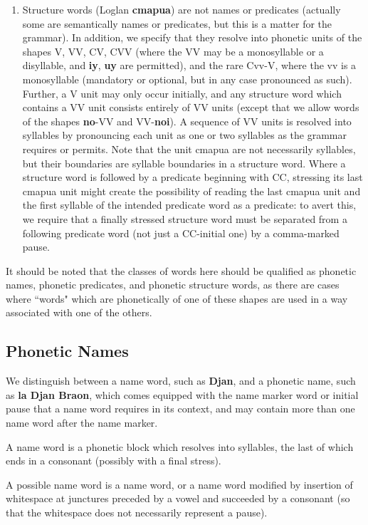 \documentclass[12pt]{book}
\begin{document}
\begin{enumerate}
\item Structure words (Loglan {\bf cmapua}) are not names or predicates (actually some are semantically names or predicates, but this is a matter for the grammar).  In addition, we specify that they resolve into phonetic units of the shapes V, VV, CV, CVV (where the VV may be a monosyllable or a disyllable, and {\bf iy}, {\bf uy} are permitted), and the rare Cvv-V, where the vv is a monosyllable (mandatory or optional, but in any case pronounced as such).
Further, a V unit may only occur initially, and any structure word which contains a VV unit consists entirely of VV units (except that we allow words of the shapes
{\bf no}-VV and VV-{\bf noi}).  A sequence of VV units is resolved into syllables by pronouncing each unit as one or two syllables as the grammar requires or permits.  Note that the unit cmapua are not necessarily syllables, but their boundaries are syllable boundaries in a structure word.  Where a structure word is followed by a predicate beginning with CC,
stressing its last cmapua unit might create the possibility of reading the last cmapua unit and the first syllable of the intended predicate word as a predicate:  to avert this, we require that a finally stressed structure word must be separated from a following predicate word (not just a CC-initial one) by a comma-marked pause.

\end{enumerate}

It should be noted that the classes of words here should be qualified as phonetic names, phonetic predicates, and phonetic structure words, as there are cases where ``words" which are phonetically of one of these shapes are used in a way associated with one of the others.

\subsection{Phonetic Names}

We distinguish between a name word, such as {\bf Djan}, and a phonetic name, such as {\bf la Djan Braon}, which comes equipped with the name marker word or initial pause that a name word requires in its context, and may contain more than one name word after the name marker.

A name word is a phonetic block which resolves into syllables, the last of which ends in a consonant (possibly with a final stress).

A possible name word is a name word, or a name word modified by insertion of whitespace at junctures preceded by a vowel and succeeded by a consonant (so that the whitespace does not necessarily represent a pause).
\end{document}
